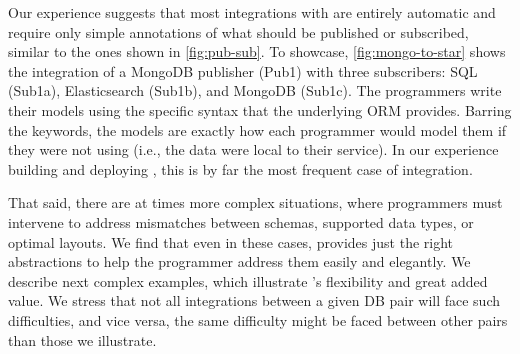   Our experience suggests that most
integrations with \synapse are entirely automatic and require only simple
annotations of what should be published or subscribed, similar to the ones shown
in \F\ref{fig:pub-sub}.  To showcase, \F\ref{fig:mongo-to-star} shows the
integration of a MongoDB publisher (Pub1) with three
subscribers: SQL (Sub1a), Elasticsearch (Sub1b), and
MongoDB (Sub1c). The programmers write their models using
the specific syntax that the underlying ORM
provides.  Barring the {} keywords, the
models are exactly how each programmer would model them if they were not using
\synapse (i.e., the data were local to their service).  In our experience
building and deploying \synapse, this is by far the most
frequent case of integration.

That said, there are at times more complex situations, where programmers must
intervene to address mismatches between schemas, supported data types, or
optimal layouts.  We find that even in these cases, \synapse provides just the
right abstractions to help the programmer address them easily and elegantly.
We describe next complex examples, which illustrate \synapse's flexibility
and great added value.  We stress that not all integrations between a given DB
pair will face such difficulties, and vice versa, the same difficulty might be
faced between other pairs than those we illustrate.

